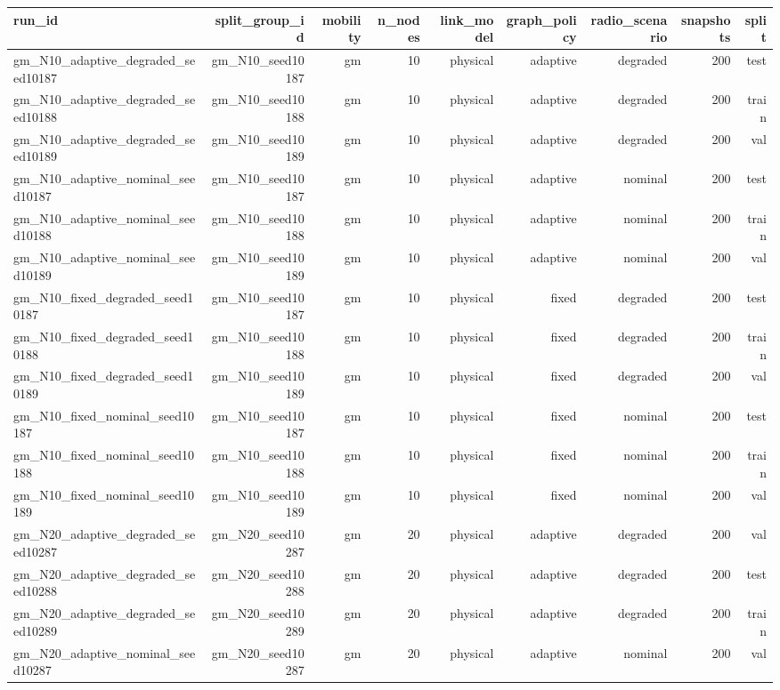 \begin{tabular}{lrrrrrrrr}
\toprule
run\_id & split\_group\_id & mobility & n\_nodes & link\_model & graph\_policy & radio\_scenario & snapshots & split \\
\midrule
gm\_N10\_adaptive\_degraded\_seed10187 & gm\_N10\_seed10187 & gm & 10 & physical & adaptive & degraded & 200 & test \\
gm\_N10\_adaptive\_degraded\_seed10188 & gm\_N10\_seed10188 & gm & 10 & physical & adaptive & degraded & 200 & train \\
gm\_N10\_adaptive\_degraded\_seed10189 & gm\_N10\_seed10189 & gm & 10 & physical & adaptive & degraded & 200 & val \\
gm\_N10\_adaptive\_nominal\_seed10187 & gm\_N10\_seed10187 & gm & 10 & physical & adaptive & nominal & 200 & test \\
gm\_N10\_adaptive\_nominal\_seed10188 & gm\_N10\_seed10188 & gm & 10 & physical & adaptive & nominal & 200 & train \\
gm\_N10\_adaptive\_nominal\_seed10189 & gm\_N10\_seed10189 & gm & 10 & physical & adaptive & nominal & 200 & val \\
gm\_N10\_fixed\_degraded\_seed10187 & gm\_N10\_seed10187 & gm & 10 & physical & fixed & degraded & 200 & test \\
gm\_N10\_fixed\_degraded\_seed10188 & gm\_N10\_seed10188 & gm & 10 & physical & fixed & degraded & 200 & train \\
gm\_N10\_fixed\_degraded\_seed10189 & gm\_N10\_seed10189 & gm & 10 & physical & fixed & degraded & 200 & val \\
gm\_N10\_fixed\_nominal\_seed10187 & gm\_N10\_seed10187 & gm & 10 & physical & fixed & nominal & 200 & test \\
gm\_N10\_fixed\_nominal\_seed10188 & gm\_N10\_seed10188 & gm & 10 & physical & fixed & nominal & 200 & train \\
gm\_N10\_fixed\_nominal\_seed10189 & gm\_N10\_seed10189 & gm & 10 & physical & fixed & nominal & 200 & val \\
gm\_N20\_adaptive\_degraded\_seed10287 & gm\_N20\_seed10287 & gm & 20 & physical & adaptive & degraded & 200 & val \\
gm\_N20\_adaptive\_degraded\_seed10288 & gm\_N20\_seed10288 & gm & 20 & physical & adaptive & degraded & 200 & test \\
gm\_N20\_adaptive\_degraded\_seed10289 & gm\_N20\_seed10289 & gm & 20 & physical & adaptive & degraded & 200 & train \\
gm\_N20\_adaptive\_nominal\_seed10287 & gm\_N20\_seed10287 & gm & 20 & physical & adaptive & nominal & 200 & val \\

\end{tabular}
